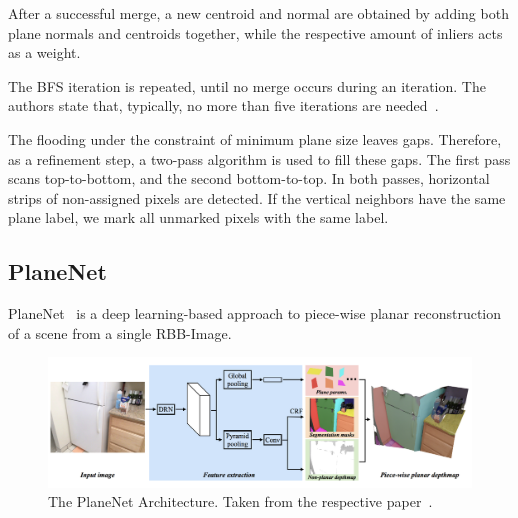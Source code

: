 \documentclass[main.tex]{subfiles}
\begin{document}
After a successful merge, a new centroid and normal are obtained by adding both plane normals and centroids together,
while the respective amount of inliers acts as a weight.

The BFS iteration is repeated, until no merge occurs during an iteration. The authors state that, typically, no more than five
iterations are needed~\cite[Section~III.E]{Roychoudhury_Missura_Bennewitz_2021_new}.

The flooding under the constraint of minimum plane size leaves gaps. Therefore, as a refinement step, a two-pass
algorithm is used to fill these gaps. The first pass scans top-to-bottom, and the second bottom-to-top.
In both passes, horizontal strips of non-assigned pixels are detected. If the vertical neighbors have the same plane label,
we mark all unmarked pixels with the same label.

\subsection{PlaneNet}
\label{subsec:bg-planenet}
PlaneNet~\cite{Liu_Yang_Ceylan_Yumer_Furukawa_2018} is a deep learning-based approach to piece-wise planar reconstruction of a scene from a single RBB-Image.

\begin{figure}[H]
    \centering
    \includegraphics[width=\textwidth]{images/planenet.png}
    \caption[PlaneNet Architecture]{The PlaneNet Architecture. Taken from the respective paper~\cite[Figure~2]{Liu_Yang_Ceylan_Yumer_Furukawa_2018}.}
    \label{fig:planenet}
\end{figure}
\end{document}
